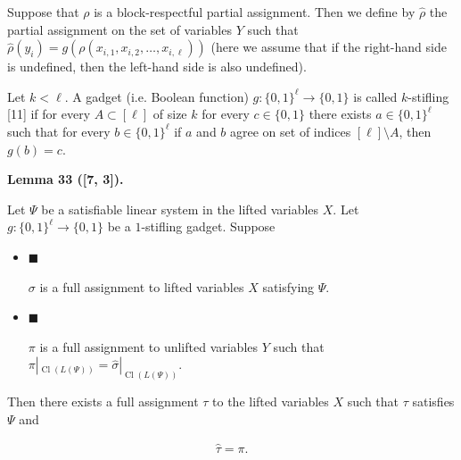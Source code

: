Suppose that $\rho$ is a block-respectful partial assignment. Then we define by $\hat{\rho}$ the partial assignment on the set of variables $Y$ such that $\hat{\rho}(y_{i})=g(\rho(x_{i,1},x_{i,2},\dots,x_{i,\ell}))$ (here we assume that if the right-hand side is undefined, then the left-hand
side is also undefined).\par



Let $k<\ell$. A gadget (i.e. Boolean function) $g:\{0,1\}^{\ell}\to\{0,1\}$ is called $k$-stifling [11] if for every $A\subset[\ell]$ of size $k$ for every $c\in\{0,1\}$ there exists $a\in\{0,1\}^{\ell}$ such that for every $b\in\{0,1\}^{\ell}$ if $a$ and $b$ agree on set of indices $[\ell]\setminus A$, then $g(b)=c$.\par



\par\medskip\noindent\textbf{
Lemma 33 ([7, 3]).
}\par



Let $\Psi$ be a satisfiable linear system in the lifted variables $X$. Let $g\colon\{0,1\}^{\ell}\to\{0,1\}$ be a $1$-stifling gadget. Suppose\par


\begin{itemize}


\item 
$\blacksquare$ 


$\sigma$ is a full assignment to lifted variables $X$ satisfying $\Psi$.\par





\item 
$\blacksquare$ 


$\pi$ is a full assignment to unlifted variables $Y$ such that $\pi|_{\mathop{\mathrm{Cl}}(L(\Psi))}=\hat{\sigma}|_{\mathop{\mathrm{Cl}}(L(\Psi))}$.\par





\end{itemize}


Then there exists a full assignment $\tau$ to the lifted variables $X$ such that $\tau$ satisfies $\Psi$ and\par





 
\[\begin{gathered}\hat{\tau}=\pi.\end{gathered}\] 
 






